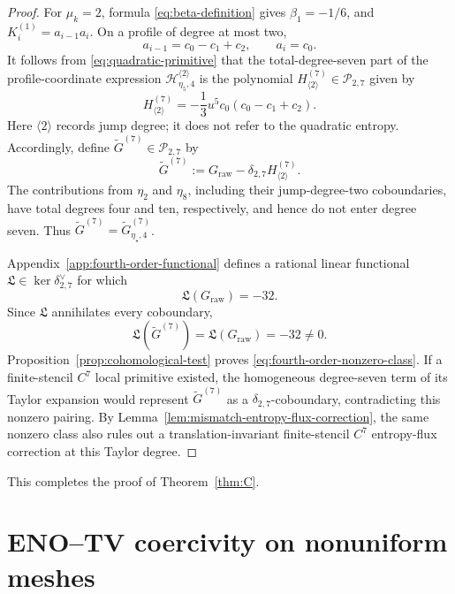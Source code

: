 \documentclass[11pt]{amsart}
\theoremstyle{plain}
\theoremstyle{definition}
\theoremstyle{remark}
\numberwithin{equation}{section}
\theoremstyle{plain}
\begin{document}
\begin{proof}
	For $\mu_k=2$, formula \eqref{eq:beta-definition} gives
	$\beta_1=-1/6$, and $K_i^{(1)}=a_{i-1}a_i$.  On a profile of degree at most
	two,
	\[
	a_{i-1}=c_0-c_1+c_2,
	\qquad a_i=c_0.
	\]
	It follows from \eqref{eq:quadratic-primitive} that the total-degree-seven
	part of the profile-coordinate expression
	$\mathscr H_{\eta_5,4}^{\langle2\rangle}$ is the polynomial
	$H_{\langle2\rangle}^{(7)}\in\mathscr P_{2,7}$ given by
	\begin{equation}\label{eq:fourth-order-H2}
		H_{\langle2\rangle}^{(7)}
		=-\frac13u^5c_0(c_0-c_1+c_2).
	\end{equation}
	Here $\langle2\rangle$ records jump degree; it does not refer to the
	quadratic entropy.
	Accordingly, define $\widetilde G^{(7)}\in\mathscr P_{2,7}$ by
	\begin{equation}\label{eq:fourth-order-reduced-mismatch}
		\widetilde G^{(7)}
		:=G_{\mathrm{raw}}-\delta_{2,7}H_{\langle2\rangle}^{(7)}.
	\end{equation}
	The contributions from $\eta_2$ and $\eta_8$, including their
	jump-degree-two coboundaries, have total degrees four and ten, respectively,
	and hence do not enter degree seven.  Thus
	$\widetilde G^{(7)}=\widetilde G_{\eta_\star,4}^{(7)}$.
	
	Appendix~\ref{app:fourth-order-functional} defines a rational linear
	functional $\mathfrak L\in\ker\delta_{2,7}^{\vee}$ for which
	\begin{equation}\label{eq:fourth-order-nonzero-pairing}
		\mathfrak L(G_{\mathrm{raw}})=-32.
	\end{equation}
	Since $\mathfrak L$ annihilates every coboundary,
	\[
	\mathfrak L(\widetilde G^{(7)})
	=\mathfrak L(G_{\mathrm{raw}})
	=-32\ne0.
	\]
	Proposition~\ref{prop:cohomological-test} proves
	\eqref{eq:fourth-order-nonzero-class}.  If a finite-stencil $C^7$ local
	primitive existed, the homogeneous degree-seven term of its Taylor
	expansion would represent $\widetilde G^{(7)}$ as a
	$\delta_{2,7}$-coboundary, contradicting this nonzero pairing. 
	By
	Lemma~\ref{lem:mismatch-entropy-flux-correction}, the same nonzero class
	also rules out a translation-invariant finite-stencil $C^7$
	entropy-flux correction at this Taylor degree.
\end{proof}


This completes the proof of Theorem~\ref{thm:C}.


\section{ENO--TV coercivity on nonuniform meshes}
\label{sec:mesh-geometry}
\end{document}
